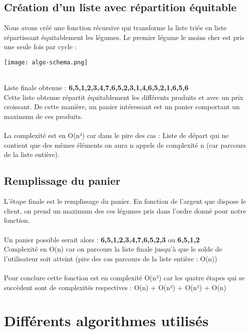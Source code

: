 \documentclass[12pt,titlepage]{report}
\begin{document}
\subsection{Création d’un liste avec répartition équitable}

Nous avons créé une fonction récursive qui transforme la liste triée en liste répartissant équitablement les légumes. Le premier légume le moins cher est pris une seule fois par cycle : \\

\begin{center}
     \texttt{[image: algo-schema.png]} 
\end{center}
\\
Liste finale obtenue : {\bf6,5,1,2,3,4,7,6,5,2,3,1,4,6,5,2,1,6,5,6} \\

Cette liste obtenue répartit équitablement les différents produits et avec un prix croissant. De cette manière, un panier intéressant est un panier comportant un maximum de ces produits. \\ \\
La complexité est en O(n²) car dans le pire des cas :
Liste de départ qui ne contient que des mêmes éléments on aura n appels de complexité n (car parcours de la liste entière).

\subsection{Remplissage du panier}

L’étape finale est le remplissage du panier. En fonction de l’argent que dispose le client, on prend un maximum des ces légumes pris dans l’ordre donné pour notre fonction.\\ \\
Un panier possible serait alors : {\bf6,5,1,2,3,4,7,6,5,2,3} ou  {\bf6,5,1,2} \\

Complexité en O(n) car on parcours la liste finale jusqu’à que le solde de l’utilisateur soit atteint (pire des cas parcours de la liste entière : O(n)) \\ \\
Pour conclure cette fonction est en complexité O(n²) car les quatre étapes qui se succèdent sont de complexités respectives : O(n) + O(n²) + O(n²) + O(n)

\section{Différents algorithmes utilisés}
\end{document}

